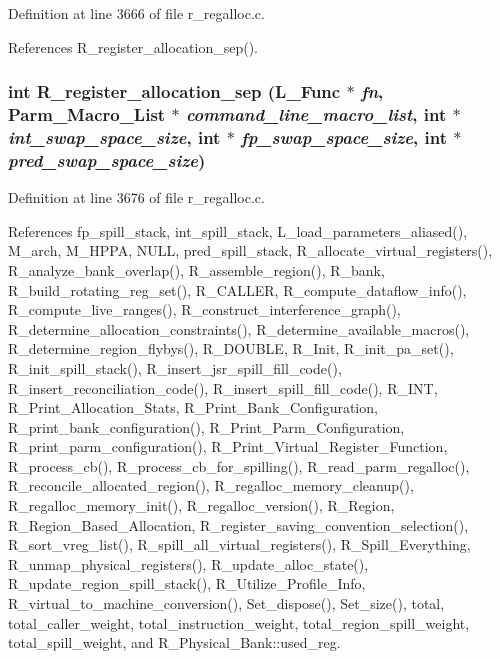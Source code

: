 Definition at line 3666 of file r\_\-regalloc.c.

References R\_\-register\_\-allocation\_\-sep().
\subsubsection{\setlength{\rightskip}{0pt plus 5cm}int R\_\-register\_\-allocation\_\-sep (L\_\-Func $\ast$ {\em fn}, \bf{Parm\_\-Macro\_\-List} $\ast$ {\em command\_\-line\_\-macro\_\-list}, int $\ast$ {\em int\_\-swap\_\-space\_\-size}, int $\ast$ {\em fp\_\-swap\_\-space\_\-size}, int $\ast$ {\em pred\_\-swap\_\-space\_\-size})}\label{r__regalloc_8c_014ca179f5a83645a5b7758081eddcb5}




Definition at line 3676 of file r\_\-regalloc.c.

References fp\_\-spill\_\-stack, int\_\-spill\_\-stack, L\_\-load\_\-parameters\_\-aliased(), M\_\-arch, M\_\-HPPA, NULL, pred\_\-spill\_\-stack, R\_\-allocate\_\-virtual\_\-registers(), R\_\-analyze\_\-bank\_\-overlap(), R\_\-assemble\_\-region(), R\_\-bank, R\_\-build\_\-rotating\_\-reg\_\-set(), R\_\-CALLER, R\_\-compute\_\-dataflow\_\-info(), R\_\-compute\_\-live\_\-ranges(), R\_\-construct\_\-interference\_\-graph(), R\_\-determine\_\-allocation\_\-constraints(), R\_\-determine\_\-available\_\-macros(), R\_\-determine\_\-region\_\-flybys(), R\_\-DOUBLE, R\_\-Init, R\_\-init\_\-pa\_\-set(), R\_\-init\_\-spill\_\-stack(), R\_\-insert\_\-jsr\_\-spill\_\-fill\_\-code(), R\_\-insert\_\-reconciliation\_\-code(), R\_\-insert\_\-spill\_\-fill\_\-code(), R\_\-INT, R\_\-Print\_\-Allocation\_\-Stats, R\_\-Print\_\-Bank\_\-Configuration, R\_\-print\_\-bank\_\-configuration(), R\_\-Print\_\-Parm\_\-Configuration, R\_\-print\_\-parm\_\-configuration(), R\_\-Print\_\-Virtual\_\-Register\_\-Function, R\_\-process\_\-cb(), R\_\-process\_\-cb\_\-for\_\-spilling(), R\_\-read\_\-parm\_\-regalloc(), R\_\-reconcile\_\-allocated\_\-region(), R\_\-regalloc\_\-memory\_\-cleanup(), R\_\-regalloc\_\-memory\_\-init(), R\_\-regalloc\_\-version(), R\_\-Region, R\_\-Region\_\-Based\_\-Allocation, R\_\-register\_\-saving\_\-convention\_\-selection(), R\_\-sort\_\-vreg\_\-list(), R\_\-spill\_\-all\_\-virtual\_\-registers(), R\_\-Spill\_\-Everything, R\_\-unmap\_\-physical\_\-registers(), R\_\-update\_\-alloc\_\-state(), R\_\-update\_\-region\_\-spill\_\-stack(), R\_\-Utilize\_\-Profile\_\-Info, R\_\-virtual\_\-to\_\-machine\_\-conversion(), Set\_\-dispose(), Set\_\-size(), total, total\_\-caller\_\-weight, total\_\-instruction\_\-weight, total\_\-region\_\-spill\_\-weight, total\_\-spill\_\-weight, and R\_\-Physical\_\-Bank::used\_\-reg.

